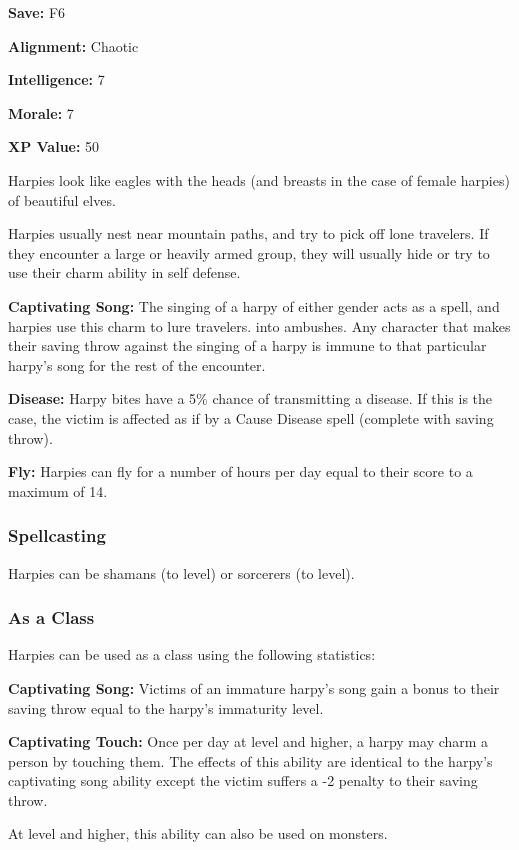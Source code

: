\begin{multicols*}{2}
{\textbf{Save:} F6

\textbf{Alignment:} Chaotic

\textbf{Intelligence:} 7

\textbf{Morale:} 7

\textbf{XP Value:} 50}

Harpies look like eagles with the heads (and breasts in the case of female harpies) of beautiful elves.

Harpies usually nest near mountain paths, and try to pick off lone travelers. If they encounter a large or heavily armed group, they will usually hide or try to use their charm ability in self defense.

\textbf{Captivating Song:} The singing of a harpy of either gender acts as a  spell, and harpies use this charm to lure travelers. into ambushes. Any character that makes their saving throw against the singing of a harpy is immune to that particular harpy’s song for the rest of the encounter.

\textbf{Disease:} Harpy bites have a 5\% chance of transmitting a disease. If this is the case, the victim is affected as if by a Cause Disease spell (complete with saving throw).

\textbf{Fly:} Harpies can fly for a number of hours per day equal to their  score to a maximum of 14.

\subsubsection{Spellcasting}
Harpies can be shamans (to  level) or sorcerers (to  level).

\subsubsection{As a Class}
Harpies can be used as a class using the following statistics:

\textbf{Captivating Song:} Victims of an immature harpy's song gain a bonus to their saving throw equal to the harpy's immaturity level.

\textbf{Captivating Touch:} Once per day at  level and higher, a harpy may charm a person by touching them. The effects of this ability are identical to the harpy's captivating song ability except the victim suffers a -2 penalty to their saving throw.

At  level and higher, this ability can also be used on monsters. 


\end{multicols*}
